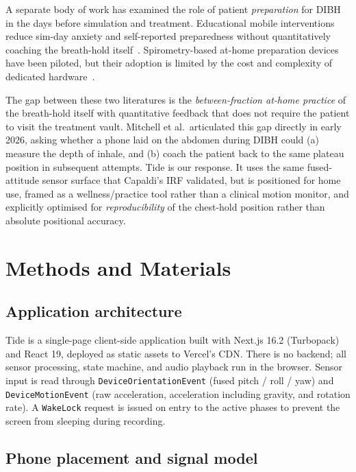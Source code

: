 \documentclass[3p,times]{elsarticle}
\begin{document}
A separate body of work has examined the role of patient
\emph{preparation} for DIBH in the days before simulation and
treatment. Educational mobile interventions reduce
sim-day anxiety and self-reported preparedness without
quantitatively coaching the breath-hold itself~\cite{mitchell2025prep,
dibhapp}. Spirometry-based at-home preparation devices have been
piloted, but their adoption is limited by the cost and complexity
of dedicated hardware~\cite{delombaerde2021spirometer}.

The gap between these two literatures is the
\emph{between-fraction at-home practice} of the breath-hold itself
with quantitative feedback that does not require the patient to
visit the treatment vault. Mitchell et al.\ articulated this gap
directly in early 2026, asking whether a phone laid on the abdomen
during DIBH could (a) measure the depth of inhale, and (b) coach
the patient back to the same plateau position in subsequent
attempts. Tide is our response. It uses the same fused-attitude
sensor surface that Capaldi's IRF validated, but is positioned for
home use, framed as a wellness/practice tool rather than a clinical
motion monitor, and explicitly optimised for
\emph{reproducibility} of the chest-hold position rather than
absolute positional accuracy.

\section{Methods and Materials}

\subsection{Application architecture}

Tide is a single-page client-side application built with Next.js
16.2 (Turbopack) and React 19, deployed as static assets to
Vercel's CDN. There is no backend; all sensor processing, state
machine, and audio playback run in the browser. Sensor input is
read through \texttt{DeviceOrientationEvent} (fused pitch / roll /
yaw) and \texttt{DeviceMotionEvent} (raw acceleration, acceleration
including gravity, and rotation rate). A \texttt{WakeLock} request
is issued on entry to the active phases to prevent the screen from
sleeping during recording.

\subsection{Phone placement and signal model}
\end{document}

